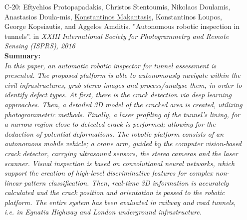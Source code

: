 \documentclass[a4paper,10pt]{article}
\begin{document}
\begin{itemize}
	\item [C-20:]Eftychios Protopapadakis, Christos Stentoumis, Nikolaos Doulamis, Anastasios Doula-mis, \underline{Konstantinos Makantasis}, Konstantinos Loupos, George Kopsiautis, and Aggelos Amditis. ''Autonomous robotic inspection in tunnels''. in \textit{XXIII International Society for Photogrammetry and Remote Sensing (ISPRS), 2016}\\
	\textbf{Summary:}\\
	\textit{In this paper, an automatic robotic inspector for tunnel assessment is presented. The proposed platform is able to autonomously navigate within the civil infrastructures, grab stereo images and process/analyse them, in order to identify defect types. At first, there is the crack detection via deep learning approaches. Then, a detailed 3D model of the cracked area is created, utilizing photogrammetric methods. Finally, a laser profiling of the tunnel's lining, for a narrow region close to detected crack is performed; allowing for the deduction of potential deformations. The robotic platform consists of an autonomous mobile vehicle; a crane arm, guided by the computer vision-based crack detector, carrying ultrasound sensors, the stereo cameras and the laser scanner. Visual inspection is based on convolutional neural networks, which support the creation of high-level discriminative features for complex non-linear pattern classification. Then, real-time 3D information is accurately calculated and the crack position and orientation is passed to the robotic platform. The entire system has been evaluated in railway and road tunnels, i.e. in Egnatia Highway and London underground infrastructure.}
	

\end{itemize}
\end{document}
